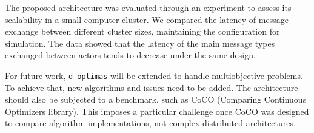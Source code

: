 \documentclass[preprint,12pt]{elsarticle}
\begin{document}
The proposed architecture was evaluated through an experiment to assess its scalability in a small computer cluster. We compared the latency of message exchange between different cluster sizes, maintaining the configuration for simulation. The data showed that the latency of the main message types exchanged between actors tends to decrease under the same design. 

For future work, \texttt{d-optimas} will be extended to handle multiobjective problems. To achieve that, new algorithms and issues need to be added. The architecture should also be subjected to a benchmark, such as CoCO (Comparing Continuous Optimizers library)\cite{hansen2021}. This imposes a particular challenge once CoCO was designed to compare algorithm implementations, not complex distributed architectures.

  
 
\end{document}
